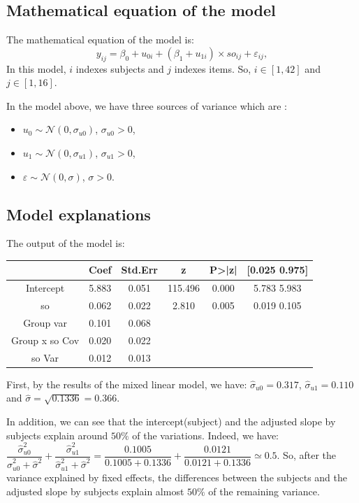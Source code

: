 \documentclass{article}
\begin{document}
\subsection{Mathematical equation of the model}
The mathematical equation of the model is:
\[y_{ij}= \beta_0 + u_{0i} + (\beta_1 + u_{1i}) \times so_{ij} + \varepsilon_{ij},\]
In this model, $i$ indexes subjects and $j$ indexes items. So, $i \in [1,42]$ and $j \in [1,16]$.

In the model above, we have three sources of variance which are :
\begin{itemize}
    \item $u_0 \sim \mathcal{N}(0,\sigma_{u0})$, $\sigma_{u0}>0$,
    \item $u_1 \sim \mathcal{N}(0,\sigma_{u1})$, $\sigma_{u1}>0$,
    \item $\varepsilon \sim \mathcal{N}(0, \sigma)$, $\sigma>0$.
\end{itemize}

\subsection{Model explanations}
The output of the model is:
\begin{center}
    \begin{tabular}{|c|c|c|c|c|c|}
    \hline
         & Coef & Std.Err & z & P>|z| & [0.025 0.975]  \\
         \hline \hline
        Intercept & 5.883 & 0.051 & 115.496 & 0.000 & 5.783 5.983\\
         so & 0.062 & 0.022 & 2.810 & 0.005 & 0.019 0.105 \\
         Group var &  0.101 & 0.068 &  & & \\
         Group x so Cov & 0.020 & 0.022 & & &\\
         so Var & 0.012 & 0.013 & & &\\
         \hline
    \end{tabular}
\end{center}

First, by the results of the mixed linear model, we have:
$\hat{\sigma}_{u0}=0.317$, $\hat{\sigma}_{u1}=0.110$ and $\hat{\sigma}=\sqrt{0.1336}=0.366$.

In addition, we can see that the intercept(subject) and the adjusted slope by subjects explain around $50\%$ of the variations. Indeed, we have: $\dfrac{\hat{\sigma}_{u0}^2}{\hat{\sigma}_{u0}^2+\hat{\sigma}^2} + \dfrac{\hat{\sigma}_{u1}^2}{\hat{\sigma}_{u1}^2+\hat{\sigma}^2} =\dfrac{0.1005}{0.1005+0.1336} + \dfrac{0.0121}{0.0121+0.1336} \simeq 0.5$.
So, after the variance explained by fixed effects, the differences between the subjects and the adjusted slope by subjects explain almost $50\%$ of the remaining variance.
\end{document}
